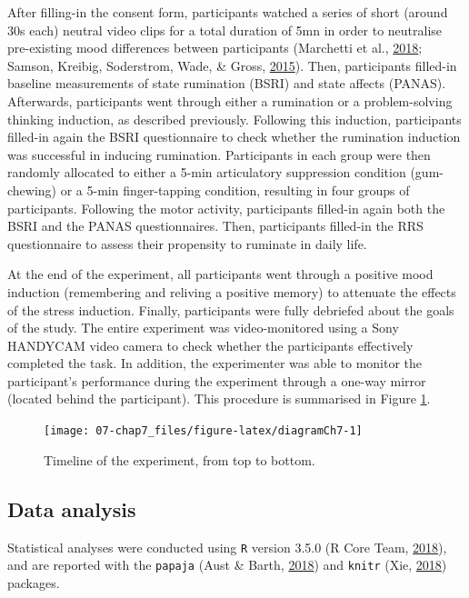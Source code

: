 \documentclass[a4paper,12pt,twoside,onecolumn,openright,final,oldfontcommands]{memoir}
\begin{document}
After filling-in the consent form, participants watched a series of short (around 30s each) neutral video clips for a total duration of 5mn in order to neutralise pre-existing mood differences between participants (Marchetti et al., \protect\hyperlink{ref-marchetti_brief_2018}{2018}; Samson, Kreibig, Soderstrom, Wade, \& Gross, \protect\hyperlink{ref-samson_eliciting_2015}{2015}). Then, participants filled-in baseline measurements of state rumination (BSRI) and state affects (PANAS). Afterwards, participants went through either a rumination or a problem-solving thinking induction, as described previously. Following this induction, participants filled-in again the BSRI questionnaire to check whether the rumination induction was successful in inducing rumination. Participants in each group were then randomly allocated to either a 5-min articulatory suppression condition (gum-chewing) or a 5-min finger-tapping condition, resulting in four groups of participants. Following the motor activity, participants filled-in again both the BSRI and the PANAS questionnaires. Then, participants filled-in the RRS questionnaire to assess their propensity to ruminate in daily life.

At the end of the experiment, all participants went through a positive mood induction (remembering and reliving a positive memory) to attenuate the effects of the stress induction. Finally, participants were fully debriefed about the goals of the study. The entire experiment was video-monitored using a Sony HANDYCAM video camera to check whether the participants effectively completed the task. In addition, the experimenter was able to monitor the participant's performance during the experiment through a one-way mirror (located behind the participant). This procedure is summarised in Figure \ref{fig:diagramCh7}.

\begin{figure}[ht]

{\centering \texttt{[image: 07-chap7\_files/figure-latex/diagramCh7-1]} 

}

\caption{Timeline of the experiment, from top to bottom.}\label{fig:diagramCh7}
\end{figure}

\hypertarget{data-analysis-3}{%
\subsection{Data analysis}\label{data-analysis-3}}

Statistical analyses were conducted using \texttt{R} version 3.5.0 (R Core Team, \protect\hyperlink{ref-R-base}{2018}), and are reported with the \texttt{papaja} (Aust \& Barth, \protect\hyperlink{ref-R-papaja}{2018}) and \texttt{knitr} (Xie, \protect\hyperlink{ref-R-knitr}{2018}) packages.
\end{document}
